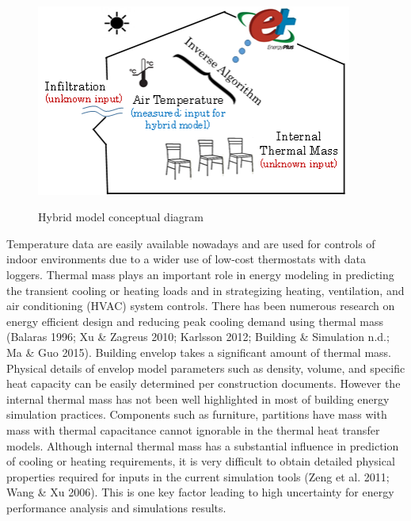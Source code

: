 \begin{figure}[h]
\begin{center}
\includegraphics[width=295pt]{media/img_HybridModel-1.png}
\caption{Hybrid model conceptual diagram}\protect \label{fig:hybrid-model-conceptual-diagram}
\end{center}
\end{figure}
{\small  }


Temperature data are easily available nowadays and are used for controls of indoor environments due to a wider use of low-cost thermostats with data loggers. Thermal mass plays an important role in energy modeling in predicting the transient cooling or heating loads and in strategizing heating, ventilation, and air conditioning (HVAC) system controls. There has been numerous research on energy efficient design and reducing peak cooling demand using thermal mass  (Balaras 1996; Xu \& Zagreus 2010; Karlsson 2012; Building \& Simulation n.d.; Ma \& Guo 2015). Building envelop takes a significant amount of thermal mass. Physical details of envelop model parameters such as density, volume, and specific heat capacity can be easily determined per construction documents. However the internal thermal mass has not been well highlighted in most of building energy simulation practices. Components such as furniture, partitions have mass with mass with thermal capacitance cannot ignorable in the thermal heat transfer models. Although internal thermal mass has a substantial influence in prediction of cooling or heating requirements, it is very difficult to obtain detailed physical properties required for inputs in the current simulation tools (Zeng et al. 2011; Wang \& Xu 2006). This is one key factor leading to high uncertainty for energy performance analysis and simulations results.

